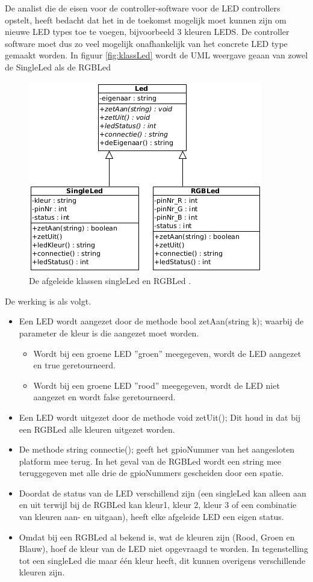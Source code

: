 De analist die de eisen voor de controller-software voor de LED controllers opstelt, heeft bedacht dat het in de toekomst mogelijk moet kunnen zijn om nieuwe LED types toe te voegen, bijvoorbeeld 3 kleuren LEDS. De controller software moet dus zo veel mogelijk onafhankelijk van het concrete LED type gemaakt worden. In figuur \ref{fig:klassLed} wordt de UML weergave geaan van zowel de SingleLed als de RGBLed
\begin{figure}[h!]
	\captionsetup{justification=centering}
	\includegraphics[width=0.6 \linewidth]{figuren/rgbKlasse}
	\centering
	\caption{De afgeleide klassen singleLed en RGBLed .}
	\label{fig:klasAfg}
\end{figure}
\newpage
De werking is als volgt.

\begin{itemize}
	\item Een LED wordt aangezet door de methode bool zetAan(string k); waarbij de parameter de kleur is die aangezet moet worden.
	\begin{itemize}
		\item Wordt bij een groene LED ''groen''  meegegeven, wordt de LED aangezet en true geretourneerd.
		\item Wordt bij een groene LED ''rood'' meegegeven, wordt de LED niet aangezet en wordt false geretourneerd.
	\end{itemize}
\item Een LED wordt uitgezet door de methode void zetUit(); Dit houd in dat bij een RGBLed alle kleuren uitgezet worden.
\item De methode string connectie(); geeft het gpioNummer van het aangesloten platform mee terug. In het geval van de RGBLed wordt een string mee teruggegeven met alle drie de gpioNummers gescheiden door een spatie.
\item Doordat de status van de LED verschillend zijn (een singleLed kan alleen aan en uit terwijl bij de RGBLed kan kleur1, kleur 2, kleur 3 of een combinatie van kleuren aan- en uitgaan), heeft elke afgeleide LED een eigen status.
\item Omdat bij een RGBLed al bekend is, wat de kleuren zijn (Rood, Groen en Blauw), hoef de kleur van de LED niet opgevraagd te worden. In tegenstelling tot een singleLed die maar \'{e}\'{e}n kleur heeft, dit kunnen overigens verschillende kleuren zijn.
\end{itemize}

